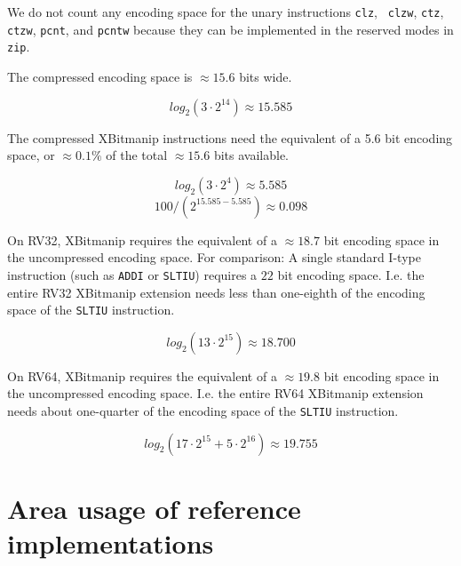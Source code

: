 We do not count any encoding space for the unary instructions {\tt clz}, {\tt
clzw}, {\tt ctz}, {\tt ctzw}, {\tt pcnt}, and {\tt pcntw} because they can
be implemented in the reserved modes in {\tt zip}.

The compressed encoding space is $\approx 15.6$ bits wide.

$$ log_2(3 \cdot 2^{14}) \approx 15.585 $$

The compressed XBitmanip instructions need the equivalent of a 5.6 bit
encoding space, or $\approx 0.1\%$ of the total $\approx 15.6$ bits available.

$$ log_2(3 \cdot 2^4) \approx 5.585 $$
$$ 100 / (2^{15.585-5.585}) \approx 0.098 $$

On RV32, XBitmanip requires the equivalent of a $\approx 18.7$ bit encoding space in
the uncompressed encoding space. For comparison: A single standard I-type
instruction (such as \texttt{ADDI} or \texttt{SLTIU}) requires a $22$ bit
encoding space. I.e. the entire RV32 XBitmanip extension needs less than
one-eighth of the encoding space of the \texttt{SLTIU} instruction.

$$ log_2(13\cdot2^{15}) \approx 18.700 $$

On RV64, XBitmanip requires the equivalent of a $\approx 19.8$ bit encoding
space in the uncompressed encoding space. I.e. the entire RV64 XBitmanip
extension needs about one-quarter of the encoding space of the \texttt{SLTIU}
instruction.

$$ log_2(17\cdot2^{15} + 5\cdot2^{16}) \approx 19.755 $$

\section{Area usage of reference implementations}

